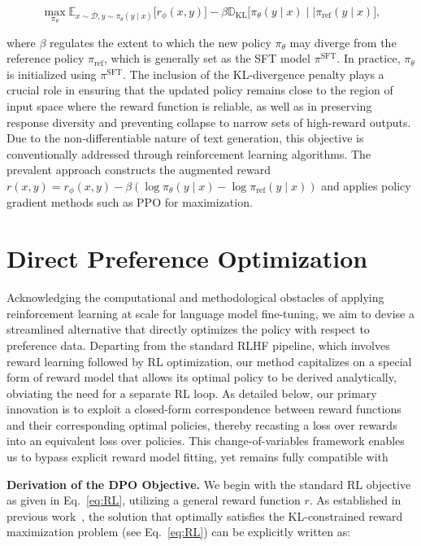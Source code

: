 \begin{equation}\label{eq:RL}
\max_{\pi_{\theta}}  \mathbb{E}_{x\sim \mathcal{D}, y\sim \pi_{\theta}(y \mid x)}\bigl[r_{\phi}(x, y)\bigr] - \beta\mathbb{D}_{\textrm{KL}}\bigl[\pi_{\theta}(y\mid x)\mid \mid \pi_\text{ref}(y\mid x)\bigr],
\end{equation}

where $\beta$ regulates the extent to which the new policy $\pi_\theta$ may diverge from the reference policy $\pi_\text{ref}$, which is generally set as the SFT model $\pi^\text{SFT}$. In practice, $\pi_\theta$ is initialized using $\pi^\text{SFT}$. The inclusion of the KL-divergence penalty plays a crucial role in ensuring that the updated policy remains close to the region of input space where the reward function is reliable, as well as in preserving response diversity and preventing collapse to narrow sets of high-reward outputs. Due to the non-differentiable nature of text generation, this objective is conventionally addressed through reinforcement learning algorithms. The prevalent approach \citep{ziegler2020finetuning, stiennon2022learning, bai2022training, ouyang2022training} constructs the augmented reward $r(x, y) = r_{\phi}(x, y) -\beta (\log \pi_{\theta}(y\mid x) - \log \pi_\text{ref}(y\mid x))$ and applies policy gradient methods such as PPO \cite{schulman2017proximal} for maximization.

\section{Direct Preference Optimization}\label{sec:DPO}

Acknowledging the computational and methodological obstacles of applying reinforcement learning at scale for language model fine-tuning, we aim to devise a streamlined alternative that directly optimizes the policy with respect to preference data. Departing from the standard RLHF pipeline, which involves reward learning followed by RL optimization, our method capitalizes on a special form of reward model that allows its optimal policy to be derived analytically, obviating the need for a separate RL loop. As detailed below, our primary innovation is to exploit a closed-form correspondence between reward functions and their corresponding optimal policies, thereby recasting a loss over rewards into an equivalent loss over policies. This change-of-variables framework enables us to bypass explicit reward model fitting, yet remains fully compatible with

\textbf{Derivation of the DPO Objective.} We begin with the standard RL objective as given in Eq.~\ref{eq:RL}, utilizing a general reward function $r$. As established in previous work~\citep{peters2007reinforcement, peng2019advantage, korbak2022reinforcement, go2023aligning}, the solution that optimally satisfies the KL-constrained reward maximization problem (see Eq.~\ref{eq:RL}) can be explicitly written as:

